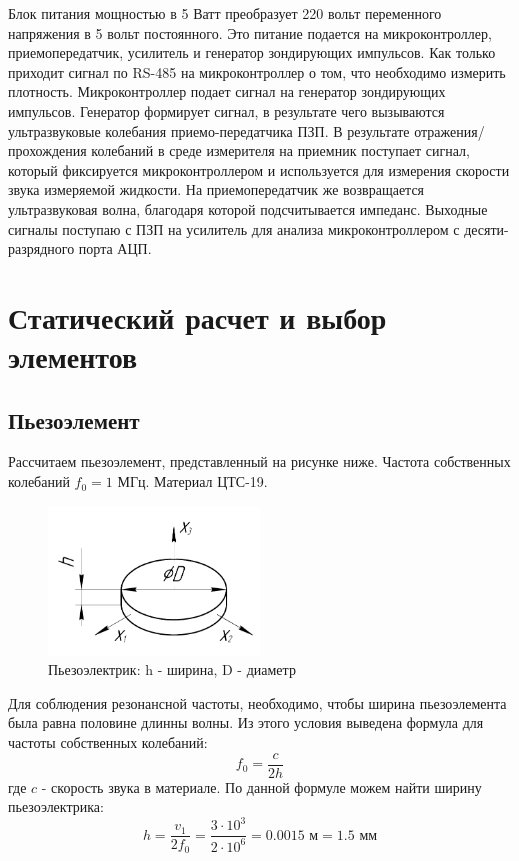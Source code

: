 \documentclass[russian, utf8, 12pt]{eskdtext}
\begin{document}
Блок питания мощностью в 5 Ватт преобразует 220 вольт переменного напряжения в 5 вольт постоянного. Это питание подается на микроконтроллер, приемопередатчик, усилитель и генератор зондирующих импульсов. Как только приходит сигнал по RS-485 на микроконтроллер о том, что необходимо измерить плотность. Микроконтроллер подает сигнал на генератор зондирующих импульсов. Генератор формирует сигнал, в результате чего вызываются ультразвуковые колебания приемо-передатчика ПЗП. В результате отражения/прохождения колебаний в среде измерителя на приемник поступает сигнал, который фиксируется микроконтроллером и используется для измерения скорости звука измеряемой жидкости. На приемопередатчик же возвращается ультразвуковая волна, благодаря которой подсчитывается импеданс. Выходные сигналы поступаю с ПЗП на усилитель для анализа микроконтроллером с десяти-разрядного порта АЦП. 

\newpage
\section{Статический расчет и выбор элементов}
\subsection{Пьезоэлемент}
Рассчитаем пьезоэлемент, представленный на рисунке ниже. Частота собственных колебаний $f_0 = 1$ МГц. Материал ЦТС-19. \par 
\begin{figure}[h!]
	\begin{center}
	\includegraphics[width = 0.5\textwidth] {PiezoceramicScheme.pdf}
	\end{center}
	\caption{Пьезоэлектрик: h - ширина, D - диаметр}
\end{figure}
Для соблюдения резонансной частоты, необходимо, чтобы ширина пьезоэлемента была равна половине длинны волны. Из этого условия выведена формула для частоты собственных колебаний:
\begin{equation}
	f_0 = \frac{c}{2h}
\end{equation}
где $c$ - скорость звука в материале. По данной формуле можем найти ширину пьезоэлектрика:
\begin{equation}
	h = \frac{v_1}{2f_0} = \frac{3\cdot 10^3}{2\cdot10^6} = 0.0015 \text{ м} = 1.5\text{ мм}
\end{equation}
\end{document}
